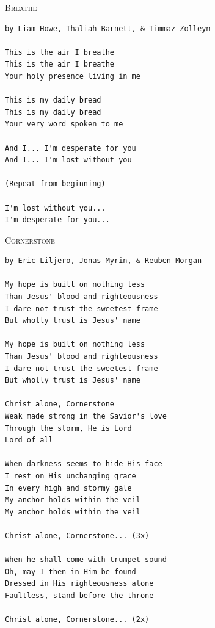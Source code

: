 \documentclass[10pt,oneside,footinclude=true,headinclude=true]{scrbook} %
\newcommand\songtitle[1]{
	\hspace*{-3.7mm}\Large\textsc{#1}
}
\begin{document}

\bigskip
\medskip
\songtitle{Breathe}
\begin{verbatim}
by Liam Howe, Thaliah Barnett, & Timmaz Zolleyn

This is the air I breathe
This is the air I breathe
Your holy presence living in me

This is my daily bread
This is my daily bread
Your very word spoken to me

And I... I'm desperate for you
And I... I'm lost without you

(Repeat from beginning)

I'm lost without you...
I'm desperate for you...
\end{verbatim}


\bigskip
\medskip
\songtitle{Cornerstone}
\begin{verbatim}
by Eric Liljero, Jonas Myrin, & Reuben Morgan

My hope is built on nothing less
Than Jesus' blood and righteousness
I dare not trust the sweetest frame
But wholly trust is Jesus' name

My hope is built on nothing less
Than Jesus' blood and righteousness
I dare not trust the sweetest frame
But wholly trust is Jesus' name

Christ alone, Cornerstone
Weak made strong in the Savior's love
Through the storm, He is Lord
Lord of all

When darkness seems to hide His face
I rest on His unchanging grace
In every high and stormy gale
My anchor holds within the veil
My anchor holds within the veil

Christ alone, Cornerstone... (3x)

When he shall come with trumpet sound
Oh, may I then in Him be found
Dressed in His righteousness alone
Faultless, stand before the throne

Christ alone, Cornerstone... (2x)
\end{verbatim}

\end{document}
